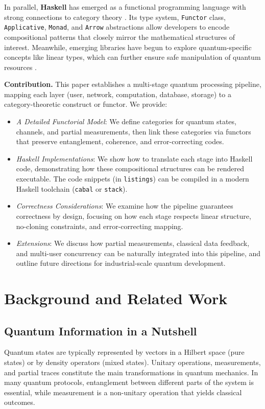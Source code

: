 \documentclass[12pt]{article}
\begin{document}
In parallel, \textbf{Haskell} has emerged as a functional programming
language with strong connections to category theory \cite{moggi}. Its
type system, \texttt{Functor} class, \texttt{Applicative}, \texttt{Monad},
and \texttt{Arrow} abstractions allow developers to encode compositional
patterns that closely mirror the mathematical structures of interest.
Meanwhile, emerging libraries have begun to explore quantum-specific
concepts like linear types, which can further ensure safe manipulation
of quantum resources \cite{quipper, linearbase}.

\textbf{Contribution.} This paper establishes a multi-stage quantum
processing pipeline, mapping each layer (user, network, computation,
database, storage) to a category-theoretic construct or functor. We
provide:

\begin{itemize}
\item \emph{A Detailed Functorial Model}: We define categories for
quantum states, channels, and partial measurements, then link these
categories via functors that preserve entanglement, coherence, and
error-correcting codes.
\item \emph{Haskell Implementations}: We show how to translate each
stage into Haskell code, demonstrating how these compositional
structures can be rendered executable. The code snippets (in \texttt{listings})
can be compiled in a modern Haskell toolchain (\texttt{cabal} or
\texttt{stack}).
\item \emph{Correctness Considerations}: We examine how the pipeline
guarantees correctness by design, focusing on how each stage
respects linear structure, no-cloning constraints, and error-correcting
mapping.
\item \emph{Extensions}: We discuss how partial measurements,
classical data feedback, and multi-user concurrency can be naturally
integrated into this pipeline, and outline future directions for
industrial-scale quantum development.
\end{itemize}

\section{Background and Related Work}

\subsection{Quantum Information in a Nutshell}
Quantum states are typically represented by vectors in a Hilbert
space (pure states) or by density operators (mixed states). Unitary
operations, measurements, and partial traces constitute the main
transformations in quantum mechanics. In many quantum protocols,
entanglement between different parts of the system is essential,
while measurement is a non-unitary operation that yields classical
outcomes.
\end{document}
